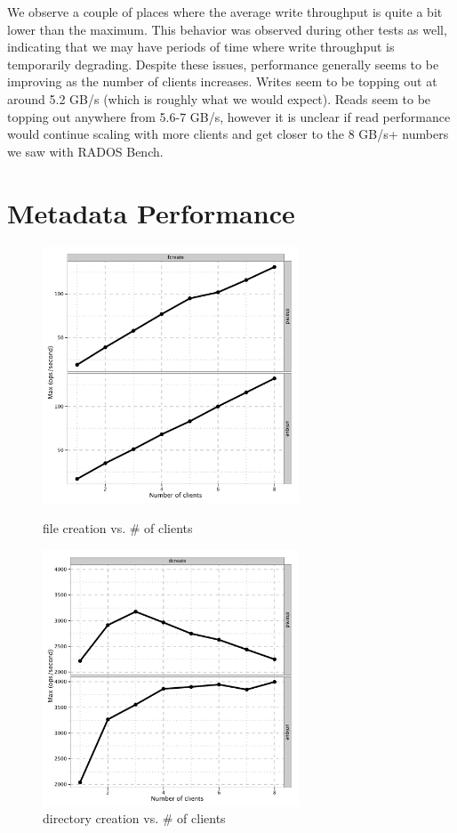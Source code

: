 \documentclass{article}
\begin{document}
We observe a couple of places where the average write throughput is quite a
bit lower than the maximum.  This behavior was observed during other tests as well,
indicating that we may have periods of time where write throughput is
temporarily degrading.  Despite these issues, performance generally seems to be
improving as the number of clients increases.  Writes seem to be topping out at
around 5.2 GB/s (which is roughly what we would expect).  Reads seem to be
topping out anywhere from 5.6-7 GB/s, however it is unclear if read performance
would continue scaling with more clients and get closer to the 8 GB/s+ numbers we
saw with RADOS Bench.


\section{Metadata Performance}

\begin{figure}[htb]
\centering
\begin{minipage}[t]{0.5\linewidth}
\centering
\includegraphics[width=3in]{data/mdtest-fcreate}
\caption{file creation vs.  \# of clients}
\label{fig:mdtest-fcreate}
\end{minipage}%
\begin{minipage}[t]{0.5\linewidth}
\centering
\includegraphics[width=3in]{data/mdtest-dcreate}
\caption{directory creation vs. \# of clients}
\label{fig:mdtest-dcreate}
\end{minipage}%
\end{figure}
\end{document}
